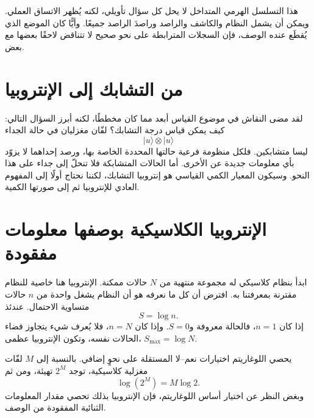 \begin{classroomqa}
\end{classroomqa}

هذا التسلسل الهرمي المتداخل لا يحل كل سؤال تأويلي، لكنه يُظهر الاتساق العملي. ويمكن أن يشمل النظام والكاشف والراصد وراصدَ الراصد جميعًا. وأيًّا كان الموضع الذي يُقطَع عنده الوصف، فإن السجلات المترابطة على نحو صحيح لا تتناقض لاحقًا بعضها مع بعض.

\section{من التشابك إلى الإنتروبيا}

لقد مضى النقاش في موضوع القياس أبعد مما كان مخططًا، لكنه أبرز السؤال التالي: كيف يمكن قياس درجة التشابك؟
لفّان مغزليان في حالة الجداء
\begin{equation}
|u\rangle\otimes|u\rangle
\end{equation}
ليسا متشابكين. فلكل منظومة فرعية حالتها المحددة الخاصة بها، ورصد إحداهما لا يزوّد بأي معلومات جديدة عن الأخرى. أما الحالات المتشابكة فلا تنحلّ إلى جداء على هذا النحو. وسيكون المعيار الكمي القياسي هو إنتروبيا التشابك، لكننا نحتاج أولًا إلى المفهوم العادي للإنتروبيا ثم إلى صورتها الكمية.

\section{الإنتروبيا الكلاسيكية بوصفها معلومات مفقودة}

ابدأ بنظام كلاسيكي له مجموعة منتهية من \(N\) حالات ممكنة. الإنتروبيا هنا خاصية للنظام مقترنة بمعرفتنا به. افترض أن كل ما نعرفه هو أن النظام يشغل واحدة من \(n\) حالات متساوية الاحتمال. عندئذ
\begin{equation}
S=\log n.
\end{equation}
إذا كان \(n=1\)، فالحالة معروفة و\(S=0\). وإذا كان \(n=N\)، فلا يُعرف شيء يتجاوز فضاء الحالات نفسه، وتكون الإنتروبيا عظمى، \(S_{\max}=\log N\).

يحصي اللوغاريتم اختيارات نعم--لا المستقلة على نحوٍ إضافي. بالنسبة إلى \(M\) لفّات مغزلية كلاسيكية، توجد \(2^M\) تهيئة، ومن ثم
\begin{equation}
\log(2^M)=M\log 2.
\end{equation}
وبغض النظر عن اختيار أساس اللوغاريتم، فإن الإنتروبيا بذلك تحصي مقدار المعلومات الثنائية المفقودة من الوصف.

